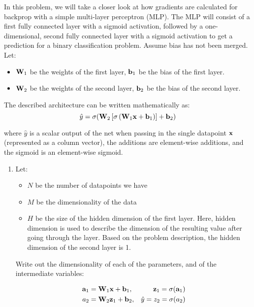 \documentclass[submit]{harvardml}
\begin{document}
\begin{problem}

  In this problem, we will take a closer look at how gradients are calculated for backprop with a simple multi-layer perceptron (MLP). The MLP will consist of a first fully connected layer with a sigmoid activation, followed by a one-dimensional, second fully connected layer with a sigmoid activation to get a prediction for a binary classification problem. Assume bias has not been merged. Let:
  \begin{itemize}
      \item $\bold{W}_1$ be the weights of the first layer, $\bold{b}_1$ be the bias of the first layer.
      \item $\bold{W}_2$ be the weights of the second layer, $\bold{b}_2$ be the bias of the second layer.
  \end{itemize}
  
  The described architecture can be written mathematically as: $$\hat{y} = \sigma(\bold{W}_2 \left[\sigma \left(\bold{W}_1 \bold{x} + \bold{b}_1\right)\right] + \bold{b}_2)$$
  
  where $\hat{y}$ is a scalar output of the net when passing in the single datapoint $\bold{x}$ (represented as a column vector), the additions are element-wise additions, and the sigmoid is an element-wise sigmoid.
  
  \begin{enumerate}
      \item Let:
      \begin{itemize}
          \item $N$ be the number of datapoints we have
          \item $M$ be the dimensionality of the data
          \item $H$ be the size of the hidden dimension of the first layer. Here, hidden dimension is used to describe the dimension of the resulting value after going through the layer. Based on the problem description, the hidden dimension of the second layer is 1.
      \end{itemize}
      
      Write out the dimensionality of each of the parameters, and of the intermediate variables:

          \begin{align*}
          \bold{a}_1 &= \bold{W}_1 \bold{x} + \bold{b}_1, 
          &\bold{z}_1 = \sigma(\bold{a}_1) \\
          a_2 &= \bold{W}_2 \bold{z}_1 + \bold{b}_2, 
          &\hat{y} = z_2 = \sigma(a_2)
          \end{align*}
          

\end{enumerate}
\end{problem}
\end{document}
